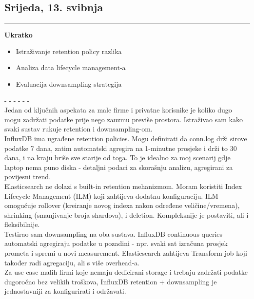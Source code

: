 \documentclass[12pt, a4paper]{article}
\newcommand{\dan}[1]{
    \subsection*{#1}
    \vspace{-0.5em} 
    \hrule \vspace{0.5em} 
}
\begin{document}
\dan{Srijeda, 13. svibnja}
\textbf{Ukratko}
\begin{itemize}
    \item Istraživanje retention policy razlika
    \item Analiza data lifecycle management-a
    \item Evaluacija downsampling strategija
\end{itemize}
- - - - - - \\
Jedan od ključnih aspekata za male firme i privatne korisnike je koliko dugo mogu zadržati podatke prije nego zauzmu previše prostora. Istraživao sam kako svaki sustav rukuje retention i downsampling-om.
\\
InfluxDB ima ugrađene retention policies. Mogu definirati da conn.log drži sirove podatke 7 dana, zatim automatski agregira na 1-minutne prosjeke i drži to 30 dana, i na kraju briše sve starije od toga. To je idealno za moj scenarij gdje laptop nema puno diska - detaljni podaci za skorašnju analizu, agregirani za povijesni trend.
\\
Elasticsearch ne dolazi s built-in retention mehanizmom. Moram koristiti Index Lifecycle Management (ILM) koji zahtijeva dodatnu konfiguraciju. ILM omogućuje rollover (kreiranje novog indexa nakon određene veličine/vremena), shrinking (smanjivanje broja shardova), i deletion. Kompleksnije je postaviti, ali i fleksibilnije.
\\
Testirao sam downsampling na oba sustava. InfluxDB continuous queries automatski agregiraju podatke u pozadini - npr. svaki sat izračuna prosjek prometa i spremi u novi measurement. Elasticsearch zahtijeva Transform job koji također radi agregaciju, ali s više overhead-a.
\\
Za use case malih firmi koje nemaju dedicirani storage i trebaju zadržati podatke dugoročno bez velikih troškova, InfluxDB retention + downsampling je jednostavniji za konfigurirati i održavati.
\end{document}
